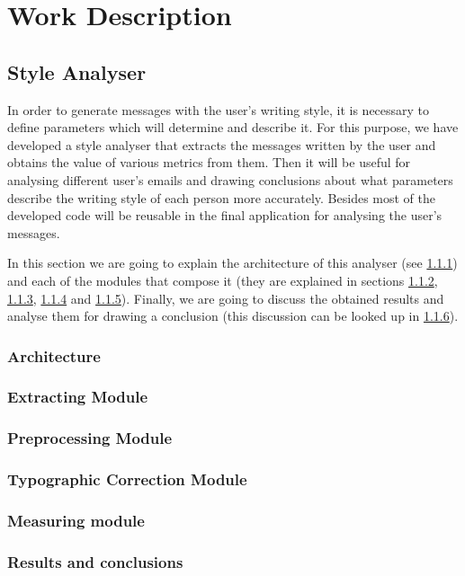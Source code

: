 \chapter{Work Description}
\label{cap:descripcionTrabajo}

\section{Style Analyser}
In order to generate messages with the user's writing style, it is necessary to define parameters which will determine and describe it. For this purpose, we have developed a style analyser that extracts the messages written by the user and obtains the value of various metrics from them. Then it will be useful for analysing different user's emails and drawing conclusions about what parameters describe the writing style of each person more accurately. Besides most of the developed code will be reusable in the final application for analysing the user's messages.

In this section we are going to explain the architecture of this analyser (see \ref{ssection:stylearch}) and each of the modules that compose it (they are explained in sections \ref{ssection:extmod}, \ref{ssection:prepmod}, \ref{ssection:typomod} and \ref{ssection:measmod}). Finally, we are going to discuss the obtained results and analyse them for drawing a conclusion (this discussion can be looked up in \ref{ssection:resconc}).

\subsection{Architecture} \label{ssection:stylearch}

\subsection{Extracting Module} \label{ssection:extmod}

\subsection{Preprocessing Module} \label{ssection:prepmod}

\subsection{Typographic Correction Module} \label{ssection:typomod}

\subsection{Measuring module} \label{ssection:measmod}

\subsection{Results and conclusions} \label{ssection:resconc}